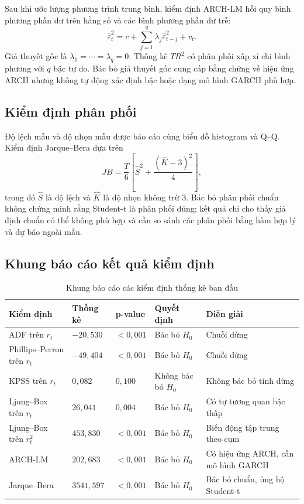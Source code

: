 \documentclass[12pt,a4paper]{article}
\numberwithin{equation}{section}
\begin{document}
Sau khi ước lượng phương trình trung bình, kiểm định ARCH-LM hồi quy bình phương phần dư trên hằng số và các bình phương phần dư trễ:
\begin{equation}
  \widehat\varepsilon_t^2
  =
  c+\sum_{j=1}^{q}\lambda_j\widehat\varepsilon_{t-j}^2+v_t.
  \label{eq:arch-lm}
\end{equation}
Giả thuyết gốc là $\lambda_1=\cdots=\lambda_q=0$. Thống kê $TR^2$ có phân phối xấp xỉ chi bình phương với $q$ bậc tự do. Bác bỏ giả thuyết gốc cung cấp bằng chứng về hiệu ứng ARCH nhưng không tự động xác định bậc hoặc dạng mô hình GARCH phù hợp.

\subsection{Kiểm định phân phối}\label{subsec:distribution-tests}

Độ lệch mẫu và độ nhọn mẫu được báo cáo cùng biểu đồ histogram và Q--Q. Kiểm định Jarque--Bera dựa trên
\begin{equation}
  JB
  =
  \frac{T}{6}
  \left[
    \widehat S^2+
    \frac{(\widehat K-3)^2}{4}
  \right],
  \label{eq:jarque-bera}
\end{equation}
trong đó $\widehat S$ là độ lệch và $\widehat K$ là độ nhọn không trừ $3$. Bác bỏ phân phối chuẩn không chứng minh rằng Student-t là phân phối đúng; kết quả chỉ cho thấy giả định chuẩn có thể không phù hợp và cần so sánh các phân phối bằng hàm hợp lý và dự báo ngoài mẫu.

\subsection{Khung báo cáo kết quả kiểm định}\label{subsec:test-reporting}

\begin{table}[H]
\centering
\caption{Khung báo cáo các kiểm định thống kê ban đầu}
\label{tab:initial-tests-template}
\begin{tabularx}{\textwidth}{Y p{0.16\textwidth}p{0.16\textwidth}p{0.17\textwidth}Y}
\toprule
\textbf{Kiểm định} & \textbf{Thống kê} & \textbf{p-value} & \textbf{Quyết định} & \textbf{Diễn giải} \\
\midrule
ADF trên $r_t$ & $-20{,}530$ & $<0{,}001$ & Bác bỏ $H_0$ & Chuỗi dừng \\
Phillips--Perron trên $r_t$ & $-49{,}404$ & $<0{,}001$ & Bác bỏ $H_0$ & Chuỗi dừng \\
KPSS trên $r_t$ & $0{,}082$ & $0{,}100$ & Không bác bỏ $H_0$ & Không bác bỏ tính dừng \\
Ljung--Box trên $r_t$ & $26{,}041$ & $0{,}004$ & Bác bỏ $H_0$ & Có tự tương quan bậc thấp \\
Ljung--Box trên $r_t^2$ & $453{,}830$ & $<0{,}001$ & Bác bỏ $H_0$ & Biến động tập trung theo cụm \\
ARCH-LM & $202{,}683$ & $<0{,}001$ & Bác bỏ $H_0$ & Có hiệu ứng ARCH, cần mô hình GARCH \\
Jarque--Bera & $3541{,}597$ & $<0{,}001$ & Bác bỏ $H_0$ & Bác bỏ chuẩn, ủng hộ Student-t \\
\bottomrule
\end{tabularx}
\end{table}
\end{document}
